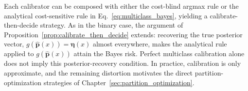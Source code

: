 Each calibrator can be composed with either the cost-blind argmax rule or the analytical cost-sensitive rule in Eq.~\ref{eq:multiclass_bayes}, yielding a calibrate-then-decide strategy. As in the binary case, the argument of Proposition~\ref{prop:calibrate_then_decide} extends: recovering the true posterior vector, $g(\hat{\mathbf{p}}(x)) = \boldsymbol{\eta}(x)$ almost everywhere, makes the analytical rule applied to $g(\hat{\mathbf{p}}(x))$ attain the Bayes risk. Perfect multiclass calibration alone does not imply this posterior-recovery condition. In practice, calibration is only approximate, and the remaining distortion motivates the direct partition-optimization strategies of Chapter~\ref{sec:partition_optimization}.
